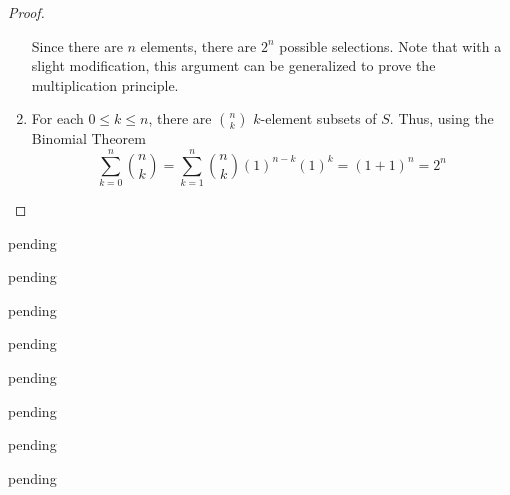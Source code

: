 \begin{exercise}
\begin{proof}
\begin{enumerate}
\begin{center}
	        \end{center}
	        Since there are \( n \) elements, there are \( 2^n \) possible selections. Note that with a slight modification, this argument can be generalized to prove the multiplication principle. 
	        
	        \item For each \( 0 \leq k \leq n \), there are \( {n \choose k} \) \(k\)-element subsets of \( S \). Thus, using the Binomial Theorem 
	        \[ \sum_{k=0}^n {n \choose k} = \sum_{k=1}^n {n \choose k} (1)^{n-k} (1)^k = (1+1)^n = 2^n \]
	    \end{enumerate}
	\end{proof}
\end{exercise}

\begin{exercise} \label{0.102}
	pending
\end{exercise}

\begin{exercise} \label{0.103}
	pending
\end{exercise}

\begin{exercise} \label{0.104}
	pending
\end{exercise}

\begin{exercise} \label{0.105}
	pending
\end{exercise}

\begin{exercise} \label{0.106}
	pending
\end{exercise}

\begin{exercise} \label{0.107}
	pending
\end{exercise}

\begin{exercise} \label{0.108}
	pending
\end{exercise}

\begin{exercise} \label{0.109}
	pending
\end{exercise}

